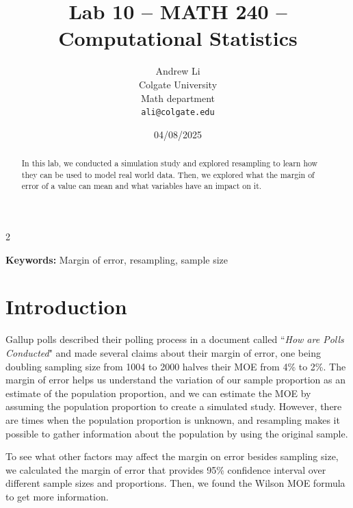 \documentclass{article}\usepackage[]{graphicx}\usepackage[]{xcolor}
\newenvironment{Figure}
  {\par\medskip\noindent\minipage{\linewidth}}
  {\endminipage\par\medskip}
\begin{document}
\vspace{-1in}
\title{Lab 10 -- MATH 240 -- Computational Statistics}

\author{
  Andrew Li \\
  Colgate University  \\
  Math department  \\
  {\tt ali@colgate.edu}
}

\date{04/08/2025}

\maketitle

\begin{multicols}{2}
\begin{abstract}
In this lab, we conducted a simulation study and explored resampling to learn how they can be used to model real world data. Then, we explored what the margin of error of a value can mean and what variables have an impact on it. 
\end{abstract}

\noindent \textbf{Keywords:} Margin of error, resampling, sample size

\section{Introduction}
Gallup polls described their polling process in a document called ``\textit{How are Polls Conducted}" and made several claims about their margin of error, one being doubling sampling size from 1004 to 2000 halves their MOE from 4\% to 2\%. The margin of error helps us understand the variation of our sample proportion as an estimate of the population proportion, and we can estimate the MOE by assuming the population proportion to create a simulated study. However, there are times when the population proportion is unknown, and resampling makes it possible to gather information about the population by using the original sample.

To see what other factors may affect the margin on error besides sampling size, we calculated the margin of error that provides 95\% confidence interval over different sample sizes and proportions. Then, we found the Wilson MOE formula to get more information. 



\end{multicols}
\end{document}
